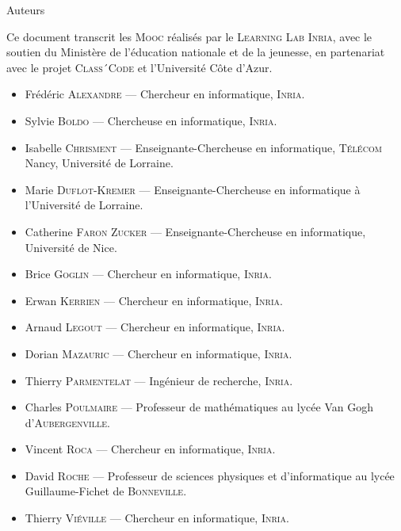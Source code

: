 \label{authorsbookmark}


\vspace{0.75cm}
\begin{center}
\begingroup
\fontsize{2.25cm}{0mm}\selectfont%
	\color{maincolor}%
	{Auteurs}
\endgroup
\end{center}

\vspace{0.5cm}

Ce document transcrit les \textsc{Mooc} réalisés par le \textsc{Learning Lab Inria}, avec le soutien du Ministère de l'éducation nationale et de la jeunesse, en partenariat avec le projet \textsc{Class´Code} et l'Université Côte d'Azur.




{\small
\begin{itemize}\jazzitem
\item Frédéric \textsc{Alexandre} --- Chercheur en informatique, \textsc{Inria}.
\item Sylvie \textsc{Boldo} --- Chercheuse en informatique, \textsc{Inria}.
\item Isabelle \textsc{Chrisment} --- Enseignante-Chercheuse en informatique, \textsc{Télécom} Nancy, Université de Lorraine.
\item Marie \textsc{Duflot-Kremer} --- Enseignante-Chercheuse en informatique à l'Université de Lorraine.
\item Catherine \textsc{Faron Zucker} --- Enseignante-Chercheuse en informatique, Université de Nice.
\item Brice \textsc{Goglin} --- Chercheur en informatique, \textsc{Inria}.
\item Erwan \textsc{Kerrien} --- Chercheur en informatique, \textsc{Inria}.
\item Arnaud \textsc{Legout} --- Chercheur en informatique, \textsc{Inria}.
\item Dorian \textsc{Mazauric} --- Chercheur en informatique, \textsc{Inria}.
\item Thierry \textsc{Parmentelat} --- Ingénieur de recherche, \textsc{Inria}.
\item Charles \textsc{Poulmaire} --- Professeur de mathématiques au lycée Van Gogh d'\textsc{Aubergenville}.
\item Vincent \textsc{Roca} --- Chercheur en informatique, \textsc{Inria}.
\item David \textsc{Roche} --- Professeur de sciences physiques et d'informatique au lycée Guillaume-Fichet de \textsc{Bonneville}.
\item Thierry \textsc{Viéville} --- Chercheur en informatique, \textsc{Inria}.
\end{itemize}}

